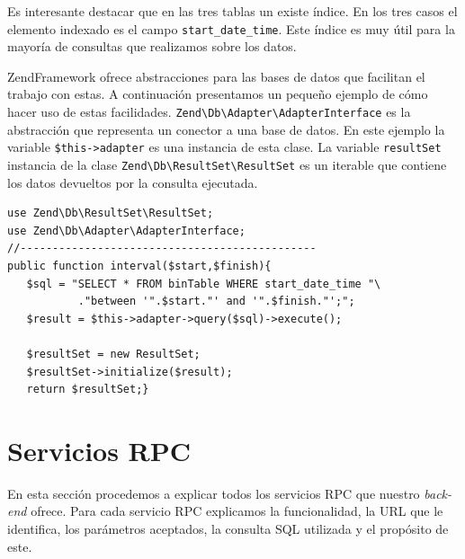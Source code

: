 	\par 
	Es interesante destacar que en las tres tablas un existe índice. En los tres casos el elemento indexado es el campo
	\texttt{start\_date\_time}. Este índice es muy útil para la mayoría de consultas que realizamos sobre los datos.
	\par
	ZendFramework ofrece abstracciones para las bases de datos que facilitan el trabajo con estas. A continuación presentamos un pequeño ejemplo
	de cómo hacer uso de estas facilidades. \texttt{Zend\textbackslash Db\textbackslash Adapter\textbackslash AdapterInterface} es la abstracción
	que representa un conector a una base de datos. En este ejemplo la variable \texttt{\$this->adapter} es una instancia de esta clase. La
	variable \texttt{resultSet} instancia de la clase \texttt{Zend\textbackslash Db\textbackslash ResultSet\textbackslash ResultSet} es un
	iterable que contiene los datos devueltos por la consulta ejecutada.
	\begin{lstlisting}[style=myPhp]
use Zend\Db\ResultSet\ResultSet;
use Zend\Db\Adapter\AdapterInterface;
//----------------------------------------------
public function interval($start,$finish){
   $sql = "SELECT * FROM binTable WHERE start_date_time "\
           ."between '".$start."' and '".$finish."';";
   $result = $this->adapter->query($sql)->execute();

   $resultSet = new ResultSet;
   $resultSet->initialize($result);
   return $resultSet;}
	\end{lstlisting}
\section{Servicios RPC}
	En esta sección procedemos a explicar todos los servicios RPC que nuestro \emph{back-end} ofrece. Para cada servicio RPC explicamos la
	funcionalidad, la URL que le identifica, los parámetros aceptados, la consulta SQL utilizada y el propósito de este.
